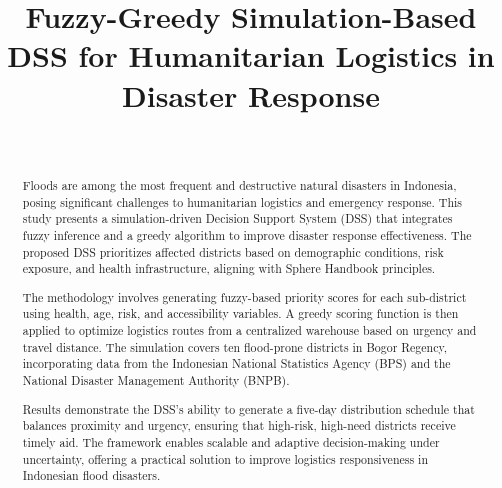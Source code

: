 \documentclass[journal,final,a4paper,twoside,11pt]{IEEEtran}
\begin{document}
\title{Fuzzy-Greedy Simulation-Based DSS for Humanitarian Logistics in Disaster Response\\
}

\author{
    \\
}


\maketitle

\begin{abstract}
Floods are among the most frequent and destructive natural disasters in Indonesia, posing significant challenges to humanitarian logistics and emergency response. This study presents a simulation-driven Decision Support System (DSS) that integrates fuzzy inference and a greedy algorithm to improve disaster response effectiveness. The proposed DSS prioritizes affected districts based on demographic conditions, risk exposure, and health infrastructure, aligning with Sphere Handbook principles.

The methodology involves generating fuzzy-based priority scores for each sub-district using health, age, risk, and accessibility variables. A greedy scoring function is then applied to optimize logistics routes from a centralized warehouse based on urgency and travel distance. The simulation covers ten flood-prone districts in Bogor Regency, incorporating data from the Indonesian National Statistics Agency (BPS) and the National Disaster Management Authority (BNPB).

Results demonstrate the DSS's ability to generate a five-day distribution schedule that balances proximity and urgency, ensuring that high-risk, high-need districts receive timely aid. The framework enables scalable and adaptive decision-making under uncertainty, offering a practical solution to improve logistics responsiveness in Indonesian flood disasters.
\end{abstract}
\end{document}
